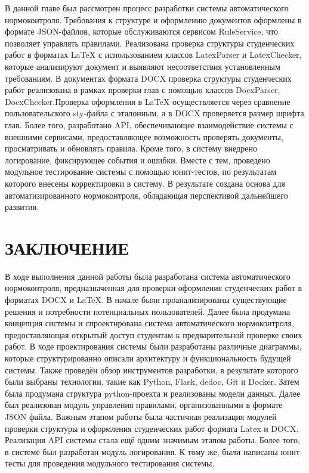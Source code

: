 \documentclass{report}
\begin{document}
В данной главе был рассмотрен процесс разработки системы автоматического нормоконтроля. Требования к структуре и оформлению документов оформлены в формате JSON-файлов, которые обслуживаются сервисом RuleService, что позволяет управлять правилами. Реализована проверка структуры студенческих работ в форматах LaTeX с использованием классов LatexParser и LatexChecker, которые анализируют документ и выявляют несоответствия установленным требованиям. В документах формата DOCX проверка структуры студенческих работ реализована в рамках проверки глав с помощью классов DocxParser, DocxChecker.Проверка оформления в LaTeX осуществляется через сравнение пользовательского sty-файла с эталонным, а в DOCX проверяется размер шрифта глав. Более того, разработано API, обеспечивающее взаимодействие системы с внешними сервисами, предоставляющее возможность проверять документы, просматривать и обновлять правила. Кроме того, в систему внедрено логирование, фиксирующее события и ошибки. Вместе с тем, проведено модульное тестирование системы с помощью юнит-тестов, по результатам которого внесены корректировки в систему. В результате создана основа для автоматизированного нормоконтроля, обладающая перспективой дальнейшего развития.


\chapter*{ЗАКЛЮЧЕНИЕ}
В ходе выполнения данной работы была разработана система автоматического нормоконтроля, предназначенная для проверки оформления студенческих работ в форматах DOCX и LaTeX. В начале были проанализированы существующие решения и потребности потенциальных пользователей. Далее была продумана концепция системы и спроектирована система автоматического нормоконтроля, предоставляющая открытый доступ студентам к предварительной проверке своих работ. В ходе проектирования системы были разработаны различные диаграммы, которые структурированно описали архитектуру и функциональность будущей системы. Также проведён обзор инструментов разработки, в результате которого были выбраны технологии, такие как Python, Flask, dedoc, Git и Docker. Затем была продумана структура python-проекта и реализованы модели данных. Далее был реализован модуль управления правилами, организованными в формате JSON файла. Важным этапом работы была частичная реализация модулей проверки структуры и оформления студенческих работ формата Latex и DOCX. Реализация API системы стала ещё одним значимым этапом работы. Более того, в системе был разработан модуль логирования. К тому же, были написаны юнит-тесты для проведения модульного тестирования системы.
\end{document}

